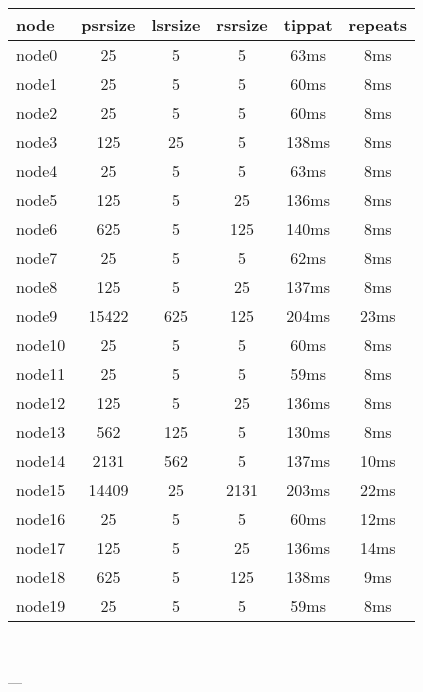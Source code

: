 

\begin{tabular}{|l|c|c|c|c|c|}
\hline node & psrsize & lsrsize & rsrsize   & tippat & repeats\\
    \hline node0 & 25 & 5 & 5 & 63ms & 8ms\\
    \hline node1 & 25 & 5 & 5 & 60ms & 8ms\\
    \hline node2 & 25 & 5 & 5 & 60ms & 8ms\\
    \hline node3 & 125 & 25 & 5 & 138ms & 8ms\\
    \hline node4 & 25 & 5 & 5 & 63ms & 8ms\\
    \hline node5 & 125 & 5 & 25 & 136ms & 8ms\\
    \hline node6 & 625 & 5 & 125 & 140ms & 8ms\\
    \hline node7 & 25 & 5 & 5 & 62ms & 8ms\\
    \hline node8 & 125 & 5 & 25 & 137ms & 8ms\\
    \hline node9 & 15422 & 625 & 125 & 204ms & 23ms\\
    \hline node10 & 25 & 5 & 5 & 60ms & 8ms\\
    \hline node11 & 25 & 5 & 5 & 59ms & 8ms\\
    \hline node12 & 125 & 5 & 25 & 136ms & 8ms\\
    \hline node13 & 562 & 125 & 5 & 130ms & 8ms\\
    \hline node14 & 2131 & 562 & 5 & 137ms & 10ms\\
    \hline node15 & 14409 & 25 & 2131 & 203ms & 22ms\\
    \hline node16 & 25 & 5 & 5 & 60ms & 12ms\\
    \hline node17 & 125 & 5 & 25 & 136ms & 14ms\\
    \hline node18 & 625 & 5 & 125 & 138ms & 9ms\\
    \hline node19 & 25 & 5 & 5 & 59ms & 8ms\\

\hline
\end{tabular} \

---


